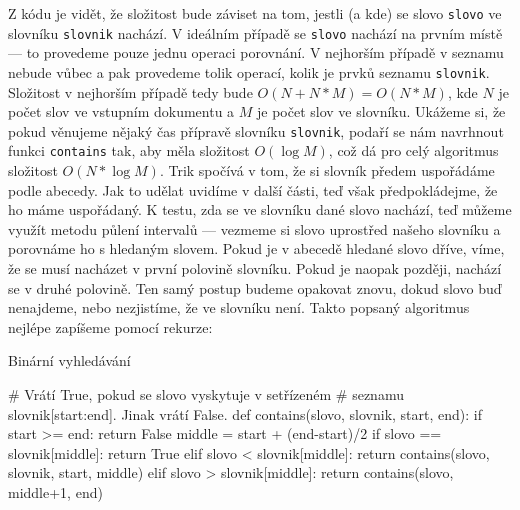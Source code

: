 Z kódu je vidět, že složitost bude záviset na tom, jestli (a kde) se slovo {\tt slovo} ve slovníku {\tt slovnik} nachází. V ideálním
případě se {\tt slovo} nachází na prvním místě --- to provedeme pouze jednu operaci porovnání. V nejhorším případě v seznamu
nebude vůbec a pak provedeme tolik operací, kolik je prvků seznamu {\tt slovnik}. Složitost v nejhorším případě tedy bude $O(N+N*M) = O(N*M)$, kde
$N$ je počet slov ve vstupním dokumentu a $M$ je počet slov ve slovníku. Ukážeme si, že pokud věnujeme nějaký čas přípravě slovníku {\tt slovnik},
podaří se nám navrhnout funkci {\tt contains} tak, aby měla složitost $O(\log M)$, což dá pro celý algoritmus složitost $O(N*\log M)$.
Trik spočívá v tom, že si slovník předem uspořádáme podle abecedy. Jak to udělat uvidíme v další části, teď však předpokládejme, že
ho máme uspořádaný. K testu, zda se ve slovníku dané slovo nachází, teď můžeme využít metodu půlení intervalů --- vezmeme si
slovo uprostřed našeho slovníku a porovnáme ho s hledaným slovem. Pokud je v abecedě hledané slovo dříve, víme, že se musí
nacházet v první polovině slovníku. Pokud je naopak později, nachází se v druhé polovině. Ten samý postup budeme opakovat znovu,
dokud slovo buď nenajdeme, nebo nezjistíme, že ve slovníku není. Takto popsaný algoritmus nejlépe zapíšeme pomocí rekurze:

\begin{program}\caption{Binární vyhledávání}
\begin{python}
# Vrátí True, pokud se slovo vyskytuje v setřízeném
# seznamu slovnik[start:end]. Jinak vrátí False.
def contains(slovo, slovnik, start, end):
  if start >= end:
    return False
  middle = start + (end-start)/2
  if slovo == slovnik[middle]:
    return True
  elif slovo < slovnik[middle]:
    return contains(slovo, slovnik, start, middle)
  elif slovo > slovnik[middle]:
    return contains(slovo, middle+1, end)
\end{python}
\end{program}

